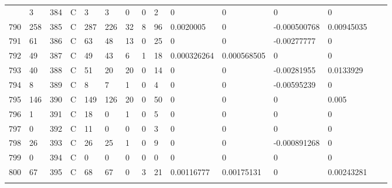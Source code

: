 \begin{longtable}{lllllllllllllll}
\begin{comment}
	789 & 3                 & 384 & C   & 3                 & 3                 & 0                 & 0    & 2          & 0              & 0              & 0             & 0            \\
	790 & 258               & 385 & C   & 287               & 226               & 32                & 8    & 96         & 0.0020005      & 0              & -0.000500768  & 0.00945035   \\
	791 & 61                & 386 & C   & 63                & 48                & 13                & 0    & 25         & 0              & 0              & -0.00277777   & 0            \\
	792 & 49                & 387 & C   & 49                & 43                & 6                 & 1    & 18         & 0.000326264    & 0.000568505    & 0             & 0            \\
	793 & 40                & 388 & C   & 51                & 20                & 20                & 0    & 14         & 0              & 0              & -0.00281955   & 0.0133929    \\
	794 & 8                 & 389 & C   & 8                 & 7                 & 1                 & 0    & 4          & 0              & 0              & -0.00595239   & 0            \\
	795 & 146               & 390 & C   & 149               & 126               & 20                & 0    & 50         & 0              & 0              & 0             & 0.005        \\
	796 & 1                 & 391 & C   & 18                & 0                 & 1                 & 0    & 5          & 0              & 0              & 0             & 0            \\
	797 & 0                 & 392 & C   & 11                & 0                 & 0                 & 0    & 3          & 0              & 0              & 0             & 0            \\
	798 & 26                & 393 & C   & 26                & 25                & 1                 & 0    & 9          & 0              & 0              & -0.000891268  & 0            \\
	799 & 0                 & 394 & C   & 0                 & 0                 & 0                 & 0    & 0          & 0              & 0              & 0             & 0            \\
	800 & 67                & 395 & C   & 68                & 67                & 0                 & 3    & 21         & 0.00116777     & 0.00175131     & 0             & 0.00243281   \\

\end{comment}
\end{longtable}
